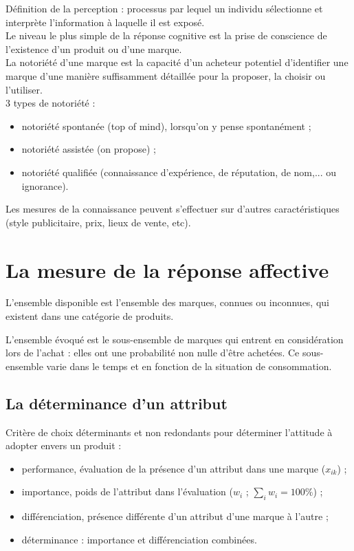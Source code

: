 	Définition de la perception : processus par lequel un individu sélectionne et interprète l'information à laquelle il est exposé. \\
	
	Le niveau le plus simple de la réponse cognitive est la prise de conscience de l'existence d'un produit ou d'une marque. \\
	
	La notoriété d'une marque est la capacité d'un acheteur potentiel d'identifier une marque d'une manière suffisamment détaillée pour la proposer, la choisir ou l'utiliser. \\
	
	3 types de notoriété :
	
	\begin{itemize}
		\item notoriété spontanée (top of mind), lorsqu'on y pense spontanément ;
		\item notoriété assistée (on propose) ;
		\item notoriété qualifiée (connaissance d'expérience, de réputation, de nom,... ou ignorance).
	\end{itemize}
	\n
	
	Les mesures de la connaissance peuvent s'effectuer sur d'autres caractéristiques (style publicitaire, prix, lieux de vente, etc).
	
	\section{La mesure de la réponse affective}

	L'ensemble disponible est l'ensemble des marques, connues ou inconnues, qui existent dans une catégorie de produits.
	
	L'ensemble évoqué est le sous-ensemble de marques qui entrent en considération lors de l'achat : elles ont une probabilité non nulle d'être achetées. Ce sous-ensemble varie dans le temps et en fonction de la situation de consommation.
	
	
	
	
		\subsection{La déterminance d'un attribut}
	
		Critère de choix déterminants et non redondants pour déterminer l'attitude à adopter envers un produit :
	
		\begin{itemize}
			\item performance, évaluation de la présence d'un attribut dans une marque ($x_{i k}$) ;
			\item importance, poids de l'attribut dans l'évaluation	 ($w_i$ ; $\sum_i w_i = 100\%$) ;
			\item différenciation, présence différente d'un attribut d'une marque à l'autre ;
			\item déterminance : importance et différenciation combinées.
		\end{itemize}	
	
